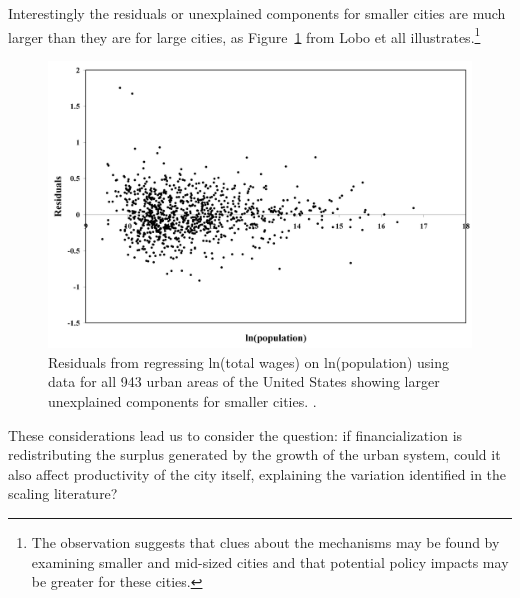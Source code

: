 Interestingly the residuals or unexplained components for smaller cities are much larger than they are for large cities, as Figure~\ref{fig-residuals-lobo} from Lobo et all \cite{loboUrbanScalingProduction2013} illustrates.\footnote{The observation suggests that clues about the mechanisms may be found by examining smaller and mid-sized cities and that potential policy impacts may be greater for these cities.} 
\begin{figure}[h!tb]
\centering
\includegraphics[scale=0.30]{fig/residuals-lobo.png}
\caption{Residuals from regressing ln(total wages) on ln(population) using data for all 943 urban areas of the United States showing larger unexplained components for smaller cities. \cite{loboUrbanScalingProduction2013}.}\label{fig-residuals-lobo}
\end{figure} 
These considerations lead us to consider the question: if financialization is redistributing the surplus generated by the growth of the urban system, could it also affect  productivity of the city itself, explaining the variation identified in the scaling literature? 



